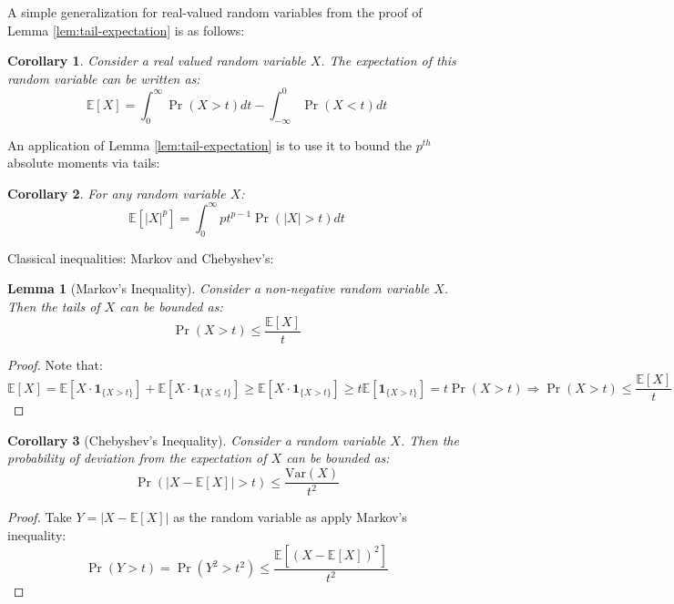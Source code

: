 \documentclass{article}
\newtheorem{corollary}{Corollary}[subsection]
\newtheorem{lemma}{Lemma}[subsection]
\theoremstyle{remark}
\newcommand{\Exp}{\mathbb{E}}
\newcommand{\Var}{\mathrm{Var}}
\newcommand{\indic}[1]{\mathbf{1}_{\{#1\}}}
\begin{document}
A simple generalization for real-valued random variables from the proof of Lemma \ref{lem:tail-expectation} is as follows:
\begin{corollary}
Consider a real valued random variable \(X\). The expectation of this random variable can be written as:
\begin{equation*}
\Exp[X] = \int_{0}^{\infty} \Pr(X > t) dt - \int_{-\infty}^{0} \Pr(X < t) dt
\end{equation*}
\end{corollary}

An application of Lemma \ref{lem:tail-expectation} is to use it to bound the \(p^{th}\) absolute moments via tails:
\begin{corollary}
\label{cor:p-abs-moment}
For any random variable \(X\):
\begin{equation*}
\Exp\left[|X|^{p}\right] = \int_{0}^{\infty} pt^{p-1} \Pr(|X| > t) dt
\end{equation*}
\end{corollary}

Classical inequalities: Markov and Chebyshev's:
\begin{lemma}[Markov's Inequality]
Consider a non-negative random variable \(X\). Then the tails of \(X\) can be bounded as:
\begin{equation*}
\Pr(X > t) \leq \frac{\Exp[X]}{t}
\end{equation*}
\end{lemma}

\begin{proof}
Note that:
\begin{equation*}
\Exp[X] = \Exp[X \cdot \indic{X > t}] + \Exp[X \cdot \indic{X \leq t}] \geq \Exp[X \cdot \indic{X > t}] \geq t \Exp[\indic{X > t}] = t \Pr(X > t) \Rightarrow \Pr(X > t) \leq \frac{\Exp[X]}{t}
\end{equation*}
\end{proof}

\begin{corollary}[Chebyshev's Inequality]
Consider a random variable \(X\). Then the probability of deviation from the expectation of \(X\) can be bounded as:
\begin{equation*}
\Pr(|X - \Exp[X]| > t) \leq \frac{\Var(X)}{t^{2}}
\end{equation*}
\end{corollary}

\begin{proof}
Take \(Y = |X - \Exp[X]|\) as the random variable as apply Markov's inequality:
\begin{equation*}
\Pr(Y > t) = \Pr(Y^{2} > t^{2}) \leq \frac{\Exp[(X - \Exp[X])^{2}]}{t^{2}}
\end{equation*}
\end{proof}
\end{document}
